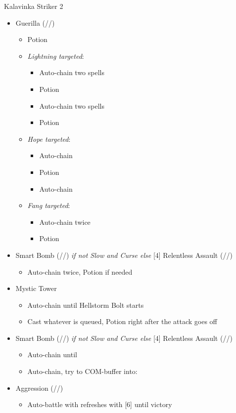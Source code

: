 \renewcommand{\first}{[1] Guerilla (\rav/\syn/\sab)}
\renewcommand{\second}{[2] Smart Bomb (\rav/\rav/\sab)}
\renewcommand{\third}{[3] Mystic Tower}
\renewcommand{\fourth}{[4] Relentless Assault (\rav/\rav/\com)}
\renewcommand{\fifth}{[5] Aggression (\com/\rav/\com)}
\begin{battle}{Kalavinka Striker 2}
\begin{itemize}
    \item \first
    \begin{itemize}
        \item Potion
        \item \textit{Lightning targeted}:
        \begin{itemize}
            \item Auto-chain two spells
            \item Potion
            \item Auto-chain two spells
            \item Potion
        \end{itemize}
        \item \textit{Hope targeted}:
        \begin{itemize}
            \item Auto-chain
            \item Potion
            \item Auto-chain
        \end{itemize}
        \item \textit{Fang targeted}:
        \begin{itemize}
            \item Auto-chain twice
            \item Potion
        \end{itemize}
    \end{itemize}
    \item \second \textit{ if not Slow and Curse else} \fourth
    \begin{itemize}
        \item Auto-chain twice, Potion if needed
    \end{itemize}
    \item \third
    \begin{itemize}
        \item Auto-chain until Hellstorm Bolt starts
        \item Cast whatever is queued, Potion right after the attack goes off
    \end{itemize}
    \item \second \textit{ if not Slow and Curse else} \fourth
    \begin{itemize}
        \item Auto-chain until \stagger
        \item Auto-chain, try to COM-buffer into:
    \end{itemize}
    \item \fifth
    \begin{itemize}
        \item Auto-battle with refreshes with [6] until victory
    \end{itemize}
\end{itemize}
\end{battle}
